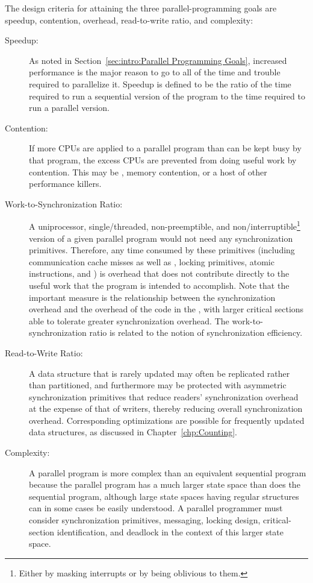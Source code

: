 The design criteria for attaining the three parallel-programming goals
are speedup,
contention, overhead, read-to-write ratio, and complexity:
\begin{description}
\item[Speedup:]  As noted in
	Section~\ref{sec:intro:Parallel Programming Goals},
	increased performance is the major reason
	to go to all of the time and trouble
	required to parallelize it.
	Speedup is defined to be the ratio of the time required
	to run a sequential version of the program to the time
	required to run a parallel version.
\item[Contention:]  If more CPUs are applied to a parallel
	program than can be kept busy by that program,
	the excess CPUs are prevented from doing
	useful work by contention.
	This may be , memory contention, or a host
	of other performance killers.
\item[Work-to-Synchronization Ratio:]  A uniprocessor,
	single\-/threaded, non-preemptible, and non\-/interruptible\footnote{
		Either by masking interrupts or by being oblivious to them.}
	version of a given parallel
	program would not need any synchronization primitives.
	Therefore, any time consumed by these primitives
	(including communication cache misses as well as
	, locking primitives, atomic instructions,
	and )
	is overhead that does not contribute directly to the useful
	work that the program is intended to accomplish.
	Note that the important measure is the
	relationship between the synchronization overhead
	and the overhead of the code in the , with larger
	critical sections able to tolerate greater synchronization overhead.
	The work-to-synchronization ratio is related to
	the notion of synchronization efficiency.
\item[Read-to-Write Ratio:]  A data structure that is
	rarely updated may often be replicated rather than partitioned,
	and furthermore may be protected with asymmetric
	synchronization primitives that reduce readers' synchronization
	overhead at the expense of that of writers, thereby
	reducing overall synchronization overhead.
	Corresponding optimizations are possible for frequently
	updated data structures, as discussed in
	Chapter~\ref{chp:Counting}.
\item[Complexity:]  A parallel program is more complex than
	an equivalent sequential program because the parallel program
	has a much larger state space than does the sequential program,
	although large state spaces having regular structures can in
	some cases be easily understood.
	A parallel programmer must
	consider synchronization primitives, messaging, locking design,
	critical-section identification,
	and deadlock in the context of this larger state space.


\end{description}
